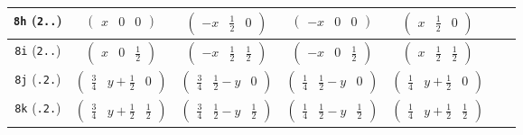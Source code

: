 \documentclass[fleqn,9pt,landscape]{jsarticle}
\begin{document}
\begin{center}
\begin{longtable}{ccccccc}
{\tt 8h} ({\tt 2..}) & $ \begin{pmatrix} x & 0 & 0 \end{pmatrix} $ & $ \begin{pmatrix} - x & \frac{1}{2} & 0 \end{pmatrix} $ & $ \begin{pmatrix} - x & 0 & 0 \end{pmatrix} $ & $ \begin{pmatrix} x & \frac{1}{2} & 0 \end{pmatrix} $ & $  $ & $  $ \\ \hline
{\tt 8i} ({\tt 2..}) & $ \begin{pmatrix} x & 0 & \frac{1}{2} \end{pmatrix} $ & $ \begin{pmatrix} - x & \frac{1}{2} & \frac{1}{2} \end{pmatrix} $ & $ \begin{pmatrix} - x & 0 & \frac{1}{2} \end{pmatrix} $ & $ \begin{pmatrix} x & \frac{1}{2} & \frac{1}{2} \end{pmatrix} $ & $  $ & $  $ \\ \hline
{\tt 8j} ({\tt .2.}) & $ \begin{pmatrix} \frac{3}{4} & y + \frac{1}{2} & 0 \end{pmatrix} $ & $ \begin{pmatrix} \frac{3}{4} & \frac{1}{2} - y & 0 \end{pmatrix} $ & $ \begin{pmatrix} \frac{1}{4} & \frac{1}{2} - y & 0 \end{pmatrix} $ & $ \begin{pmatrix} \frac{1}{4} & y + \frac{1}{2} & 0 \end{pmatrix} $ & $  $ & $  $ \\ \hline
{\tt 8k} ({\tt .2.}) & $ \begin{pmatrix} \frac{3}{4} & y + \frac{1}{2} & \frac{1}{2} \end{pmatrix} $ & $ \begin{pmatrix} \frac{3}{4} & \frac{1}{2} - y & \frac{1}{2} \end{pmatrix} $ & $ \begin{pmatrix} \frac{1}{4} & \frac{1}{2} - y & \frac{1}{2} \end{pmatrix} $ & $ \begin{pmatrix} \frac{1}{4} & y + \frac{1}{2} & \frac{1}{2} \end{pmatrix} $ & $  $ & $  $ \\ \hline

\end{longtable}
\end{center}
\end{document}
